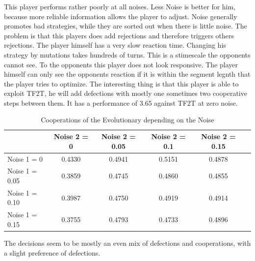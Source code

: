 \documentclass[11pt,twoside]{article}
\begin{document}
This player performs rather poorly at all noises. Less Noise is better for him, because more reliable information allows the player to adjust. Noise generally promotes bad strategies, while they are sorted out when there is little noise. The problem is that this players does add rejections and therefore triggers others rejections. The player himself has a very slow reaction time. Changing his strategy by mutations takes hundreds of turns. This is a stimescale the opponents cannot see. To the opponents this player does not look responsive. The player himself can only see the opponents reaction if it is within the segment legnth that the player tries to optimize. The interesting thing is that this player is able to exploit TF2T, he will add defections with mostly one sometimes two cooperative steps between them. It has a performance of 3.65 against TF2T at zero noise.

\begin{table}[h]
 \begin{center}
\caption{Cooperations of the Evolutionary depending on the Noise} \vspace{3mm}
\begin{tabular}{|l|c|c|c|c|c|}
\hline
   	& Noise 2 = 0 & Noise 2 = 0.05& Noise 2 = 0.1& Noise 2 = 0.15 \\
  \hline
  Noise 1 = 0 	&         0.4330 & 0.4941  &  0.5151  &  0.4878 \\
 \hline
  Noise 1 = 0.05	 &          0.3859   & 0.4745 &   0.4860 &   0.4855\\
 \hline
  Noise 1 = 0.10 	&    0.3987 &   0.4750&    0.4919&    0.4914 \\
 \hline
  Noise 1 = 0.15 	&     0.3755 &   0.4793  &  0.4733  &  0.4896 \\
 \hline
\end{tabular}
 \end{center}
\end{table}

The decisions seem to be mostly an even mix of defections and cooperations, with a slight preference of defections.


\newpage
\end{document}

